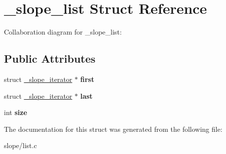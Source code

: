 \hypertarget{struct__slope__list}{\section{\+\_\+slope\+\_\+list Struct Reference}
\label{struct__slope__list}
}


Collaboration diagram for \+\_\+slope\+\_\+list\+:
\subsection*{Public Attributes}
\begin{DoxyCompactItemize}
\item 
\hypertarget{struct__slope__list_ae4755b2ce5e8e2894fd42f99a803b6ee}{struct \hyperlink{struct__slope__iterator}{\+\_\+slope\+\_\+iterator} $\ast$ {\bfseries first}}\label{struct__slope__list_ae4755b2ce5e8e2894fd42f99a803b6ee}

\item 
\hypertarget{struct__slope__list_a83a3ca98c4f39466fec5a1caf37c975b}{struct \hyperlink{struct__slope__iterator}{\+\_\+slope\+\_\+iterator} $\ast$ {\bfseries last}}\label{struct__slope__list_a83a3ca98c4f39466fec5a1caf37c975b}

\item 
\hypertarget{struct__slope__list_a36ba8b99c1187709b8c489815bea4413}{int {\bfseries size}}\label{struct__slope__list_a36ba8b99c1187709b8c489815bea4413}

\end{DoxyCompactItemize}


The documentation for this struct was generated from the following file\+:\begin{DoxyCompactItemize}
\item 
slope/list.\+c\end{DoxyCompactItemize}
